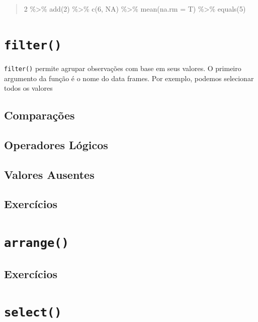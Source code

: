 \documentclass[]{book}
\begin{document}
\begin{quote}
2 \%\textgreater\%
add(2) \%\textgreater\%
c(6, NA) \%\textgreater\%
mean(na.rm = T) \%\textgreater\%
equals(5)
\end{quote}

\hypertarget{filter-1}{%
\section{\texorpdfstring{\texttt{filter()}}{filter()}}\label{filter-1}}

\texttt{filter()} permite agrupar observações com base em seus valores. O primeiro argumento da função é o nome do data frames. Por exemplo, podemos selecionar todos os valores

\hypertarget{comparauxe7uxf5es}{%
\subsection{Comparações}\label{comparauxe7uxf5es}}

\hypertarget{operadores-luxf3gicos}{%
\subsection{Operadores Lógicos}\label{operadores-luxf3gicos}}

\hypertarget{valores-ausentes}{%
\subsection{Valores Ausentes}\label{valores-ausentes}}

\hypertarget{exercuxedcios-5}{%
\subsection{Exercícios}\label{exercuxedcios-5}}

\hypertarget{arrange}{%
\section{\texorpdfstring{\texttt{arrange()}}{arrange()}}\label{arrange}}

\hypertarget{exercuxedcios-6}{%
\subsection{Exercícios}\label{exercuxedcios-6}}

\hypertarget{select-1}{%
\section{\texorpdfstring{\texttt{select()}}{select()}}\label{select-1}}
\end{document}
